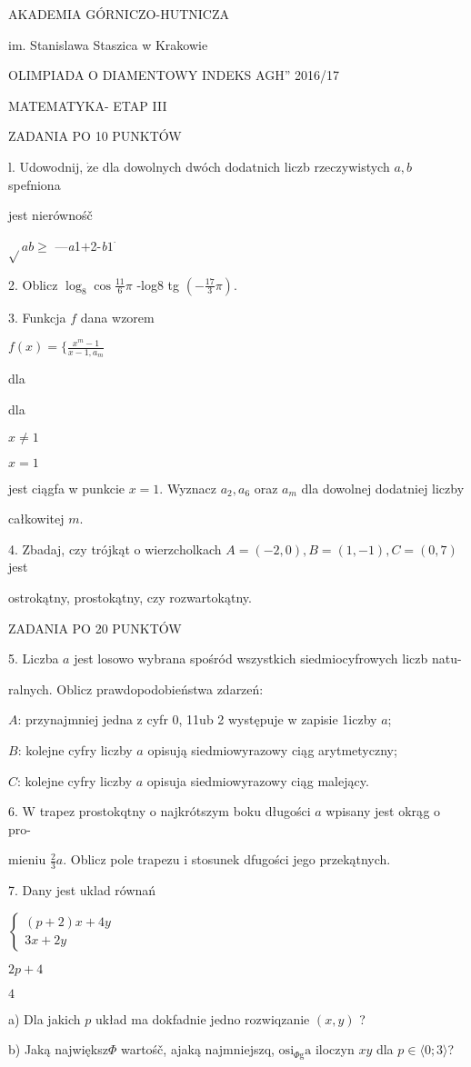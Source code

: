 \documentclass[a4paper,12pt]{article}
\begin{document}
AKADEMIA GÓRNICZO-HUTNICZA

im. Stanislawa Staszica w Krakowie

OLIMPIADA O DIAMENTOWY INDEKS AGH'' 2016/17

MATEMATYKA- ETAP III

ZADANIA PO 10 PUNKTÓW

l. Udowodnij, $\dot{\mathrm{z}}\mathrm{e}$ dla dowolnych dwóch dodatnich liczb rzeczywistych $a, b$ spefniona

jest nierównośč

$\sqrt{}ab\geq$ ---{\it a}1$+$2-{\it b}$1^{\cdot}$

2. Oblicz $\displaystyle \log_{8}\cos\frac{11}{6}\pi$ -log8 tg $(-\displaystyle \frac{17}{3}\pi).$

3. Funkcja $f$ dana wzorem

$f(x)=\displaystyle \{\frac{x^{m}-1}{x-1,a_{m}}$

dla

dla

$x\neq 1$

$x=1$

jest ciągfa w punkcie $x=1$. Wyznacz $a_{2}, a_{6}$ oraz $a_{m}$ dla dowolnej dodatniej liczby

całkowitej $m.$

4. Zbadaj, czy trójkąt o wierzcholkach $A = (-2,0), B = (1,-1), C = (0,7)$ jest

ostrokątny, prostokątny, czy rozwartokątny.

ZADANIA PO 20 PUNKTÓW

5. Liczba $a$ jest losowo wybrana spośród wszystkich siedmiocyfrowych liczb natu-

ralnych. Oblicz prawdopodobieństwa zdarzeń:

$A$: przynajmniej jedna z cyfr 0, 11ub 2 występuje w zapisie 1iczby $a$;

$B$: kolejne cyfry liczby $a$ opisują siedmiowyrazowy ciąg arytmetyczny;

$C$: kolejne cyfry liczby $a$ opisuja siedmiowyrazowy ciąg malejący.

6. $\mathrm{W}$ trapez prostokqtny o najkrótszym boku długości $a$ wpisany jest okrąg o pro-

mieniu $\displaystyle \frac{2}{3}a$. Oblicz pole trapezu i stosunek dfugości jego przekątnych.

7. Dany jest uklad równań

$\left\{\begin{array}{l}
(p+2)x+4y\\
3x+2y
\end{array}\right.$

$2p+4$

$4$

a) Dla jakich $p$ układ ma dokfadnie jedno rozwiqzanie $(x,y)$ ?

b) Jaką największ$\Phi$ wartośč, ajaką najmniejszq, $\mathrm{o}\mathrm{s}\mathrm{i}_{\Phi \mathrm{g}}\mathrm{a}$ iloczyn $xy$ dla $ p\in\langle 0;3\rangle$?
\end{document}
